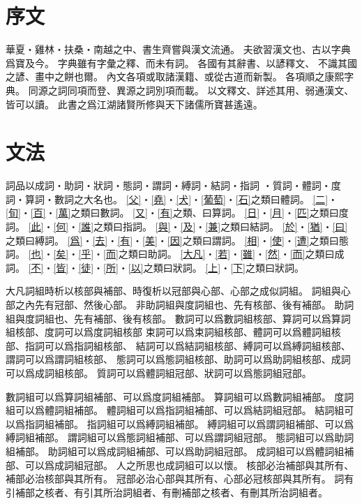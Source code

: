 \chapter*{序文}
華夏・雞林・扶桑・南越之中、書生齊嘗與漢文流通。
夫欲習漢文也、古以字典爲寶及今。
字典雖有字彙之釋、而未有詞。
各國有其辭書、以諺釋文、
不識其國之諺、畫中之餅也爾。
內文各項或取諸漢籍、或從古道而新製。
各項順之康熙字典。
同源之詞同項而登、異源之詞別項而載。
以文釋文、詳述其用、弱通漢文、皆可以讀。
此書之爲江湖諸賢所修與天下諸儒所寶甚遙遠。
\chapter*{文法}
詞品以成詞・助詞・狀詞・態詞・謂詞・縛詞・結詞・指詞
・質詞・體詞・度詞・算詞・數詞之大名也。
\cref{父}・\cref{堯}・\cref{犬}・\cref{葡萄}・\cref{石}之類曰體詞。
\cref{二}・\cref{旬}・\cref{百}・\cref{萬}之類曰數詞。
\cref{又}・\cref{有}之類、曰算詞。
\cref{日}・\cref{月}・\cref{匹}之類曰度詞。
\cref{此}・\cref{何}・\cref{誰}之類曰指詞。
\cref{與}・\cref{及}・\cref{兼}之類曰結詞。
\cref{於}・\cref{猶}・\cref{曰}之類曰縛詞。
\cref{爲}・\cref{去}・\cref{有}・\cref{美}・\cref{因}之類曰謂詞。
\cref{相}・\cref{使}・\cref{遭}之類曰態詞。
\cref{也}・\cref{矣}・\cref{乎}・\cref{而}之類曰助詞。
\cref{大凡}・\cref{若}・\cref{雖}・\cref{然}・\cref{而}之類曰成詞。
\cref{不}・\cref{皆}・\cref{徒}・\cref{所}・\cref{以}之類曰狀詞。
\cref{上}・\cref{下}之類曰狀詞。

大凡詞組時析以核部與補部、時復析以冠部與心部、心部之成似詞組。
詞組與心部之內先有冠部、然後心部。
非助詞組與度詞組也、先有核部、後有補部。
助詞組與度詞組也、先有補部、後有核部。
數詞可以爲數詞組核部、算詞可以爲算詞組核部、度詞可以爲度詞組核部
束詞可以爲束詞組核部、體詞可以爲體詞組核部、指詞可以爲指詞組核部、
結詞可以爲結詞組核部、縛詞可以爲縛詞組核部、謂詞可以爲謂詞組核部、
態詞可以爲態詞組核部、助詞可以爲助詞組核部、成詞可以爲成詞組核部。
質詞可以爲體詞組冠部、狀詞可以爲態詞組冠部。

數詞組可以爲算詞組補部、可以爲度詞組補部。
算詞組可以爲數詞組補部。
度詞組可以爲體詞組補部。
體詞組可以爲指詞組補部、可以爲結詞組冠部。
結詞組可以爲指詞組補部。
指詞組可以爲縛詞組補部。
縛詞組可以爲謂詞組補部、可以爲縛詞組補部。
謂詞組可以爲態詞組補部、可以爲謂詞組冠部。
態詞組可以爲助詞組補部。
助詞組可以爲成詞組補部、可以爲助詞組冠部。
成詞組可以爲體詞組補部、可以爲成詞組冠部。
人之所思也成詞組可以以懷。
核部必治補部與其所有、補部必治核部與其所有。
冠部必治心部與其所有、心部必冠核部與其所有。
詞有引補部之核者、有引其所治詞組者、有刪補部之核者、有刪其所治詞組者。
